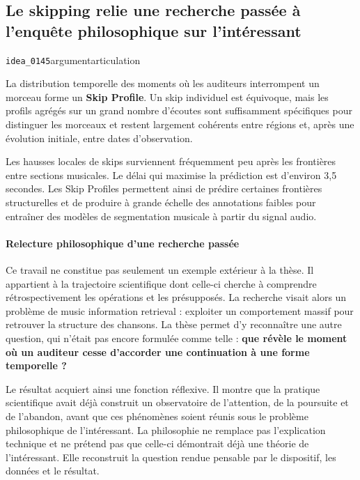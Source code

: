 \documentclass[10pt,a4paper]{article}
\begin{document}
\subsection{Le skipping relie une recherche passée à l'enquête philosophique sur l'intéressant}
{\small\color{metadata} \texttt{idea\_0145}\quad\textbullet\quad argument\quad\textbullet\quad articulation\par}

La distribution temporelle des moments où les auditeurs interrompent un morceau forme un \textbf{Skip Profile}. Un skip individuel est équivoque, mais les profils agrégés sur un grand nombre d'écoutes sont suffisamment spécifiques pour distinguer les morceaux et restent largement cohérents entre régions et, après une évolution initiale, entre dates d'observation.

Les hausses locales de skips surviennent fréquemment peu après les frontières entre sections musicales. Le délai qui maximise la prédiction est d'environ 3,5 secondes. Les Skip Profiles permettent ainsi de prédire certaines frontières structurelles et de produire à grande échelle des annotations faibles pour entraîner des modèles de segmentation musicale à partir du signal audio.

\paragraph{Relecture philosophique d'une recherche passée}
Ce travail ne constitue pas seulement un exemple extérieur à la thèse. Il appartient à la trajectoire scientifique dont celle-ci cherche à comprendre rétrospectivement les opérations et les présupposés. La recherche visait alors un problème de music information retrieval : exploiter un comportement massif pour retrouver la structure des chansons. La thèse permet d'y reconnaître une autre question, qui n'était pas encore formulée comme telle : \textbf{que révèle le moment où un auditeur cesse d'accorder une continuation à une forme temporelle ?}

Le résultat acquiert ainsi une fonction réflexive. Il montre que la pratique scientifique avait déjà construit un observatoire de l'attention, de la poursuite et de l'abandon, avant que ces phénomènes soient réunis sous le problème philosophique de l'intéressant. La philosophie ne remplace pas l'explication technique et ne prétend pas que celle-ci démontrait déjà une théorie de l'intéressant. Elle reconstruit la question rendue pensable par le dispositif, les données et le résultat.
\end{document}
